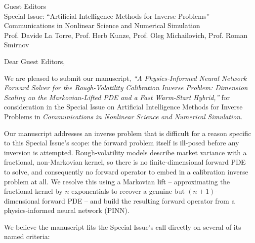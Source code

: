 \documentclass[12pt]{letter}
\begin{document}
\begin{letter}{Guest Editors \\ Special Issue: ``Artificial Intelligence Methods for Inverse Problems'' \\ Communications in Nonlinear Science and Numerical Simulation \\ Prof. Davide La Torre, Prof. Herb Kunze, Prof. Oleg Michailovich, Prof. Roman Smirnov}

\opening{Dear Guest Editors,}

We are pleased to submit our manuscript, \textit{``A Physics-Informed Neural
Network Forward Solver for the Rough-Volatility Calibration Inverse Problem:
Dimension Scaling on the Markovian-Lifted PDE and a Fast Warm-Start Hybrid,''}
for consideration in the Special Issue on Artificial Intelligence Methods for
Inverse Problems in \textit{Communications in Nonlinear Science and Numerical
Simulation}.

Our manuscript addresses an inverse problem that is difficult for a reason
specific to this Special Issue's scope: the forward problem itself is
ill-posed before any inversion is attempted. Rough-volatility models describe
market variance with a fractional, non-Markovian kernel, so there is no
finite-dimensional forward PDE to solve, and consequently no forward operator
to embed in a calibration inverse problem at all. We resolve this using a
Markovian lift -- approximating the fractional kernel by $n$ exponentials to
recover a genuine but $(n{+}1)$-dimensional forward PDE -- and build the
resulting forward operator from a physics-informed neural network (PINN).

We believe the manuscript fits the Special Issue's call directly on several
of its named criteria:


\end{letter}
\end{document}
